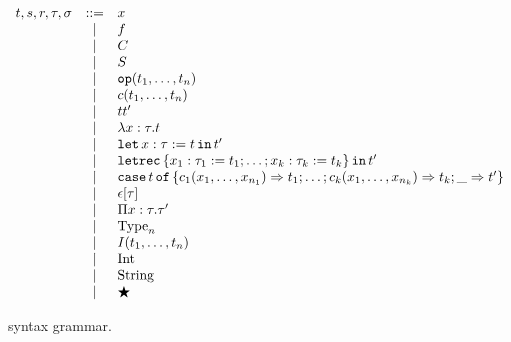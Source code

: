 \documentclass[
    9pt,            %
    techreport,        %
    affiltop,       %
]{art}
\begin{document}
\begin{figure}[H]
\[
\begin{array}{rcl}
t, s, r, \tau, \sigma &::=& x \\
  & \mid & f  \\
  & \mid & C \\
  & \mid & S \\
  & \mid & \mathtt{op}(t_1, \ldots, t_n) \\
  & \mid & c(t_1, \ldots, t_n) \\
  & \mid & t t' \\
  & \mid & \lambda x : \tau . t \\
  & \mid & \mathtt{let}\,x : \tau := t\,\mathtt{in}\,t' \\
  & \mid & \mathtt{letrec}\,\{x_1 : \tau_1 := t_1; \ldots; x_k : \tau_k := t_k\}\,\mathtt{in}\,t' \\
  & \mid & \mathtt{case}\,t\,\mathtt{of}\,\{c_1(x_1,\ldots,x_{n_1}) \Rightarrow t_1; \ldots; c_k(x_1,\ldots,x_{n_k}) \Rightarrow t_k; \_ \Rightarrow t'\} \\
  & \mid & \epsilon[\tau] \\
  & \mid & \Pi x : \tau . \tau' \\
  & \mid & \mathrm{Type}_n \\
  & \mid & I(t_1,\ldots,t_n) \\
  & \mid & \mathrm{Int} \\
  & \mid & \mathrm{String} \\
  & \mid & \bigstar
\end{array}
\]
\caption{\JuvixCore{} syntax grammar.}
\label{fig:grammar}
\end{figure}
\end{document}
